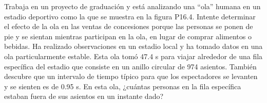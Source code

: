 \item Trabaja en un proyecto de graduación y está analizando una “ola” humana en un estadio deportivo como la que se muestra en la figura P16.4. Intente determinar el efecto de la ola en las ventas de concesiones porque las personas se ponen de pie y se sientan mientras participan en la ola, en lugar de comprar alimentos o bebidas. Ha realizado observaciones en un estadio local y ha tomado datos en una ola particularmente estable. Esta ola tomó 47.4 s para viajar alrededor de una fila específica del estadio que consiste en un anillo circular de 974 asientos. También descubre que un intervalo de tiempo típico para que los espectadores se levanten y se sienten es de 0.95 s. En esta ola, ¿cuántas personas en la fila específica estaban fuera de sus asientos en un instante dado?
